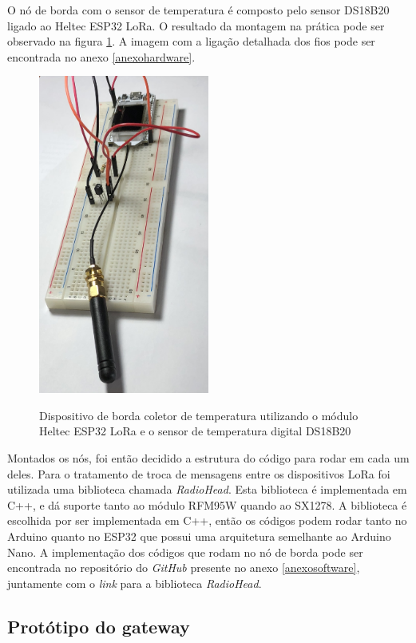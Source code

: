 \documentclass[
    hidelinks,
	12pt,				%
	openany,
	oneside, 
	a4paper,			%
	english,			%
	french,				%
	spanish,			%
	brazil				%
	]{abntex2}
\begin{document}
O nó de borda com o sensor de temperatura é composto pelo sensor DS18B20 ligado ao Heltec ESP32 LoRa. O resultado da montagem na prática pode ser observado na figura \ref{fig:temp1}. A imagem com a ligação detalhada dos fios pode ser encontrada no anexo \ref{anexohardware}. 

\begin{figure}[ht]
    \centering
    \caption{Dispositivo de borda coletor de temperatura utilizando o módulo Heltec ESP32 LoRa e o sensor de temperatura digital DS18B20}
    \includegraphics[width=0.5\textwidth]{temp1.jpg}
    \label{fig:temp1}
\end{figure}

Montados os nós, foi então decidido a estrutura do código para rodar em cada um deles. Para o tratamento de troca de mensagens entre os dispositivos LoRa foi utilizada uma biblioteca chamada \textit{RadioHead}. Esta biblioteca é implementada em C++, e dá suporte tanto ao módulo RFM95W quando ao SX1278. A biblioteca é escolhida por ser implementada em C++, então os códigos podem rodar tanto no Arduino quanto no ESP32 que possui uma arquitetura semelhante ao Arduino Nano. A implementação dos códigos que rodam no nó de borda pode ser encontrada no repositório do \textit{GitHub} presente no anexo \ref{anexosoftware}, juntamente com o \textit{link} para a biblioteca \textit{RadioHead}.

\subsection{Protótipo do gateway}
\end{document}
